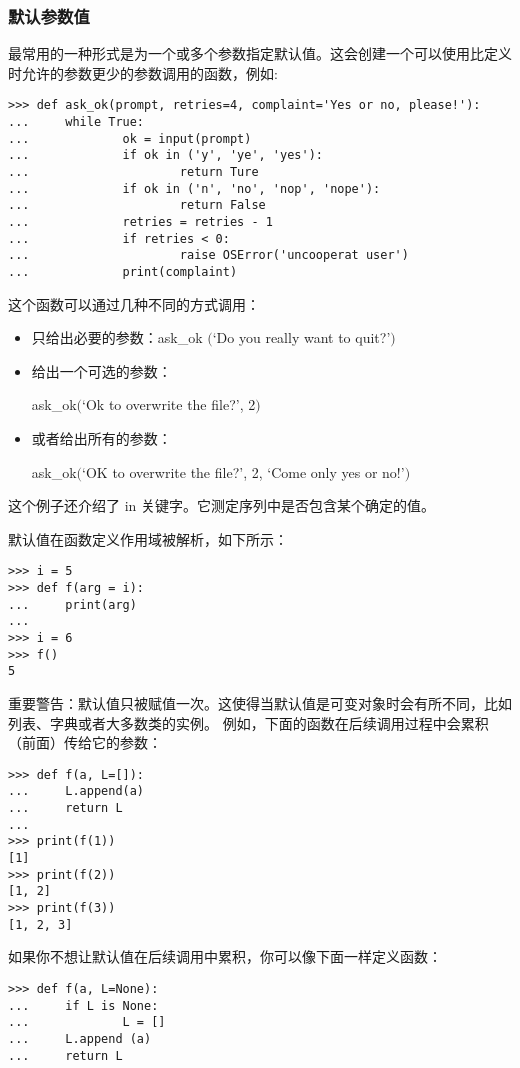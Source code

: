 \documentclass[UTF8]{ctexart}
\begin{document}
\subsubsection{默认参数值}
最常用的一种形式是为一个或多个参数指定默认值。这会创建一个可以使用比定义时允许的参数更少的参数调用的函数，例如:
\begin{verbatim}
>>> def ask_ok(prompt, retries=4, complaint='Yes or no, please!'):
...     while True:
...             ok = input(prompt)
...             if ok in ('y', 'ye', 'yes'):
...                     return Ture
...             if ok in ('n', 'no', 'nop', 'nope'):
...                     return False
...             retries = retries - 1
...             if retries < 0:
...                     raise OSError('uncooperat user')
...             print(complaint)
\end{verbatim}

这个函数可以通过几种不同的方式调用：
\begin{itemize}
  \item 只给出必要的参数：ask\_ok $($`Do you really want to quit?'$)$
  \item 给出一个可选的参数：

  ask\_ok$($`Ok to overwrite the file?', 2$)$
  \item 或者给出所有的参数：

  ask\_ok$($`OK to overwrite the file?', 2, `Come only yes or no!'$)$
\end{itemize}

这个例子还介绍了 in 关键字。它测定序列中是否包含某个确定的值。

默认值在函数定义作用域被解析，如下所示：
\begin{verbatim}
>>> i = 5
>>> def f(arg = i):
...     print(arg)
...
>>> i = 6
>>> f()
5
\end{verbatim}

重要警告：默认值只被赋值一次。这使得当默认值是可变对象时会有所不同，比如列表、字典或者大多数类的实例。
例如，下面的函数在后续调用过程中会累积（前面）传给它的参数：
\begin{verbatim}
>>> def f(a, L=[]):
...     L.append(a)
...     return L
...
>>> print(f(1))
[1]
>>> print(f(2))
[1, 2]
>>> print(f(3))
[1, 2, 3]
\end{verbatim}

如果你不想让默认值在后续调用中累积，你可以像下面一样定义函数：
\begin{verbatim}
>>> def f(a, L=None):
...     if L is None:
...             L = []
...     L.append (a)
...     return L
\end{verbatim}
\end{document}
